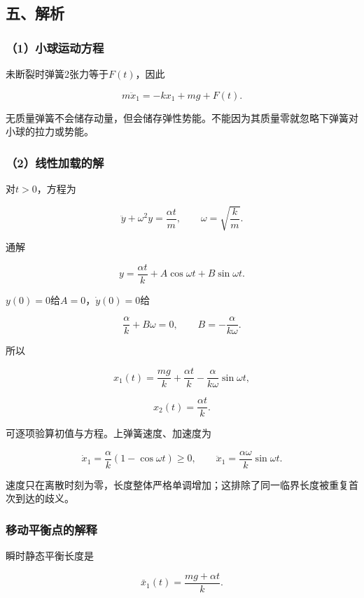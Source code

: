 \documentclass[12pt,a4paper,fontset=fandol]{ctexart}
\begin{document}
\subsection{五、解析}\label{ux4e94ux89e3ux6790-4}

\subsubsection{（1）小球运动方程}\label{ux5c0fux7403ux8fd0ux52a8ux65b9ux7a0b}

未断裂时弹簧2张力等于\(F(t)\)，因此

\[
\boxed{m\ddot x_1=-kx_1+mg+F(t)}.
\]

无质量弹簧不会储存动量，但会储存弹性势能。不能因为其质量零就忽略下弹簧对小球的拉力或势能。

\subsubsection{（2）线性加载的解}\label{ux7ebfux6027ux52a0ux8f7dux7684ux89e3}

对\(t>0\)，方程为

\[
\ddot y+\omega^2y=\frac{\alpha t}{m},
\qquad \omega=\sqrt{\frac km}.
\]

通解

\[
y=\frac{\alpha t}{k}+A\cos\omega t+B\sin\omega t.
\]

\(y(0)=0\)给\(A=0\)，\(\dot y(0)=0\)给

\[
\frac\alpha k+B\omega=0,
\qquad B=-\frac{\alpha}{k\omega}.
\]

所以

\[
\boxed{x_1(t)=\frac{mg}k+\frac{\alpha t}k
-\frac{\alpha}{k\omega}\sin\omega t},
\]

\[
\boxed{x_2(t)=\frac{\alpha t}k}.
\]

可逐项验算初值与方程。上弹簧速度、加速度为

\[
\dot x_1=\frac\alpha k(1-\cos\omega t)\geq0,
\qquad
\ddot x_1=\frac{\alpha\omega}k\sin\omega t.
\]

速度只在离散时刻为零，长度整体严格单调增加；这排除了同一临界长度被重复首次到达的歧义。

\subsubsection{移动平衡点的解释}\label{ux79fbux52a8ux5e73ux8861ux70b9ux7684ux89e3ux91ca}

瞬时静态平衡长度是

\[
\bar x_1(t)=\frac{mg+\alpha t}{k}.
\]
\end{document}
